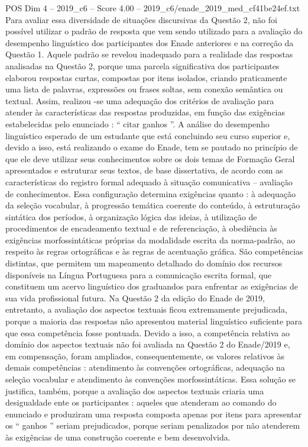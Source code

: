 \begin{textsample}{POS Dim 4 – 2019\_c6 – Score 4.00 – 2019\_c6/enade\_2019\_med\_cf41be24ef.txt}
Para avaliar essa diversidade de situações discursivas da Questão 2, não foi possível utilizar o padrão de resposta que vem sendo utilizado para a avaliação do desempenho linguístico dos participantes dos Enade anteriores e na correção da Questão 1.
Aquele padrão se revelou inadequado para a realidade das respostas analisadas na Questão 2, porque uma parcela significativa dos participantes elaborou respostas curtas, compostas por itens isolados, criando praticamente uma lista de palavras, expressões ou frases soltas, sem conexão semântica ou textual.
Assim, realizou -se uma adequação dos critérios de avaliação para atender às características das respostas produzidas, em função das exigências estabelecidas pelo enunciado : “ citar ganhos ”.
A análise do desempenho linguístico esperado de um estudante que está concluindo seu curso superior e, devido a isso, está realizando o exame do Enade, tem se pautado no princípio de que ele deve utilizar seus conhecimentos sobre os dois temas de Formação Geral apresentados e estruturar seus textos, de base dissertativa, de acordo com as características do registro formal adequado à situação comunicativa – avaliação de conhecimentos.
Essa configuração determina exigências quanto : à adequação da seleção vocabular, à progressão temática coerente do conteúdo, à estruturação sintática dos períodos, à organização lógica das ideias, à utilização de procedimentos de encadeamento textual e de referenciação, à obediência às exigências morfossintáticas próprias da modalidade escrita da norma-padrão, ao respeito às regras ortográficas e às regras de acentuação gráfica.
São competências distintas, que permitem um mapeamento detalhado do domínio dos recursos disponíveis na Língua Portuguesa para a comunicação escrita formal, que constituem um acervo linguístico dos graduandos para enfrentar as exigências de sua vida profissional futura.
Na Questão 2 da edição do Enade de 2019, entretanto, a avaliação dos aspectos textuais ficou extremamente prejudicada, porque a maioria das respostas não apresentou material linguístico suficiente para que essa competência fosse pontuada.
Devido a isso, a competência relativa ao domínio dos aspectos textuais não foi avaliada na Questão 2 do Enade/2019 e, em compensação, foram ampliados, consequentemente, os valores relativos às demais competências : atendimento às convenções ortográficas, adequação na seleção vocabular e atendimento às convenções morfossintáticas.
Essa solução se justifica, também, porque a avaliação dos aspectos textuais criaria uma desigualdade ente os participantes : aqueles que atenderam ao comando do enunciado e produziram uma resposta composta apenas por itens para apresentar os “ ganhos ” seriam prejudicados, porque seriam penalizados por não atenderem às exigências de uma construção coerente e bem desenvolvida.

\end{textsample}
